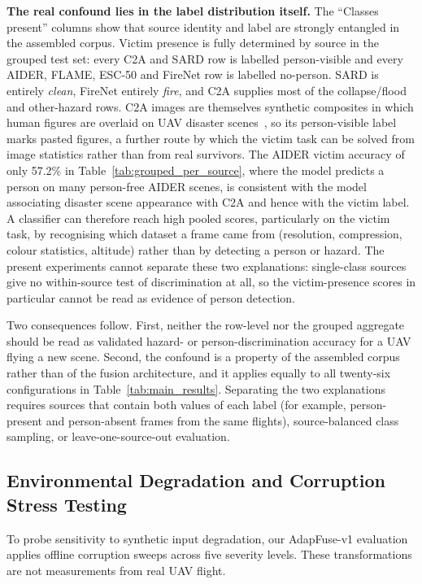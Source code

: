 \documentclass[journal]{IEEEtran}
\begin{document}
\textbf{The real confound lies in the label distribution itself.} The ``Classes present'' columns show that source identity and label are strongly entangled in the assembled corpus. Victim presence is fully determined by source in the grouped test set: every C2A and SARD row is labelled person-visible and every AIDER, FLAME, ESC-50 and FireNet row is labelled no-person. SARD is entirely \emph{clean}, FireNet entirely \emph{fire}, and C2A supplies most of the collapse/flood and other-hazard rows. C2A images are themselves synthetic composites in which human figures are overlaid on UAV disaster scenes~\cite{nihal2024c2a}, so its person-visible label marks pasted figures, a further route by which the victim task can be solved from image statistics rather than from real survivors. The AIDER victim accuracy of only 57.2\% in Table~\ref{tab:grouped_per_source}, where the model predicts a person on many person-free AIDER scenes, is consistent with the model associating disaster scene appearance with C2A and hence with the victim label. A classifier can therefore reach high pooled scores, particularly on the victim task, by recognising which dataset a frame came from (resolution, compression, colour statistics, altitude) rather than by detecting a person or hazard. The present experiments cannot separate these two explanations: single-class sources give no within-source test of discrimination at all, so the victim-presence scores in particular cannot be read as evidence of person detection.

Two consequences follow. First, neither the row-level nor the grouped aggregate should be read as validated hazard- or person-discrimination accuracy for a UAV flying a new scene. Second, the confound is a property of the assembled corpus rather than of the fusion architecture, and it applies equally to all twenty-six configurations in Table~\ref{tab:main_results}. Separating the two explanations requires sources that contain both values of each label (for example, person-present and person-absent frames from the same flights), source-balanced class sampling, or leave-one-source-out evaluation.

\subsection{Environmental Degradation and Corruption Stress Testing}
\label{sec:robustness_stress_test}

To probe sensitivity to synthetic input degradation, our AdapFuse-v1 evaluation applies offline corruption sweeps across five severity levels. These transformations are not measurements from real UAV flight.
\end{document}
